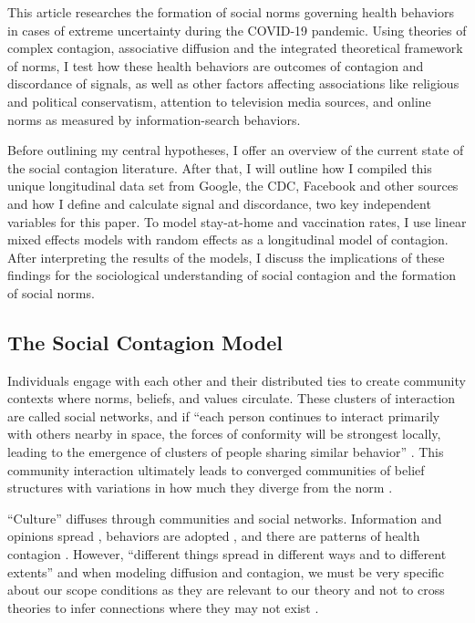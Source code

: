 This article researches the formation of social norms governing health behaviors
in cases of extreme uncertainty during the COVID-19 pandemic. Using theories of
complex contagion, associative diffusion and the integrated theoretical
framework of norms, I test how these health behaviors are outcomes of contagion
and discordance of signals, as well as other factors affecting associations like
religious and political conservatism, attention to television media sources, and
online norms as measured by information-search behaviors.

Before outlining my
central hypotheses, I offer an overview of the current state of the social
contagion literature. After that, I will outline how I compiled this unique
longitudinal data set from Google, the CDC, Facebook and other sources and how I
define and calculate signal and discordance, two key independent variables for
this paper. To model stay-at-home and vaccination rates, I use linear mixed
effects models with random effects as a longitudinal model of contagion. After
interpreting the results of the models, I discuss the implications of these
findings for the sociological understanding of social contagion and the
formation of social norms.

\hypertarget{the-social-contagion-model}{\subsection{The Social Contagion Model}\label{the-social-contagion-model}}

Individuals engage with each other and their distributed ties to create
community contexts where norms, beliefs, and values circulate. These clusters of
interaction are called social networks, and if ``each person continues to
interact primarily with others nearby in space, the forces of conformity will be
strongest locally, leading to the emergence of clusters of people sharing
similar behavior'' \citep{kitts_shi18}. This community interaction ultimately
leads to converged communities of belief structures with variations in how much
they diverge from the norm \citep{cullumCulturalEvolutionInterpersonal2007,
lataneExperimentalEvidenceDynamic1996, okadaStructureCulturalRejection2017}.

``Culture'' diffuses through communities and social networks. Information and
opinions spread \citep{bond_etal12,
fowler2010cooperative,klarEffectNetworkStructure2017}, behaviors are adopted
\citep{aralExerciseContagionGlobal2017, centolaSpreadBehaviorOnline2010,
centolaExperimentalStudyHomophily2011,christakis2008collective,rosenquist2010spread},
and there are patterns of health contagion 
\citep{cacioppo2009alone,christakisSpreadObesityLarge2007}. However, ``different
things spread in different ways and to different extents'' \citep[p.
563]{christakisSocialContagionTheory2013} and when modeling diffusion and
contagion, we must be very specific about our scope conditions as they are
relevant to our theory and not to cross theories to infer connections where they
may not exist \citep{kitts_quintane20}.

